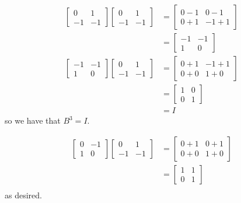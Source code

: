 \documentclass[12pt,letterpaper]{article}
\theoremstyle{definition}
\begin{document}
\begin{align*}
  \begin{bmatrix}
    0 & 1 \\
    -1 & -1
  \end{bmatrix}
  \begin{bmatrix}
    0 & 1 \\
    -1 & -1
  \end{bmatrix} &=
  \begin{bmatrix}
    0 - 1 & 0 -1 \\
    0 + 1 & -1 + 1
  \end{bmatrix} \\
  &=
  \begin{bmatrix}
    - 1 & -1 \\
    1 & 0
  \end{bmatrix} \\
  \begin{bmatrix}
    - 1 & -1 \\
    1 & 0
  \end{bmatrix}
  \begin{bmatrix}
    0 & 1 \\
    -1 & -1
  \end{bmatrix} &=
  \begin{bmatrix}
    0 + 1 & -1 + 1 \\
    0 + 0 & 1 + 0
  \end{bmatrix} \\
      &=
  \begin{bmatrix}
    1 & 0 \\
    0 & 1
  \end{bmatrix} \\
  &= I
\end{align*}
so we have that $B^{3} = I$.

\begin{align*}
  \begin{bmatrix}
    0 & -1 \\
    1 & 0
  \end{bmatrix}
  \begin{bmatrix}
    0 & 1 \\
    -1 & -1
  \end{bmatrix} &=
  \begin{bmatrix}
    0 + 1 & 0 + 1 \\
    0 + 0 & 1 + 0
  \end{bmatrix} \\
      &=
  \begin{bmatrix}
    1 & 1 \\
    0 & 1
  \end{bmatrix} \\
\end{align*}
as desired.
\end{document}
